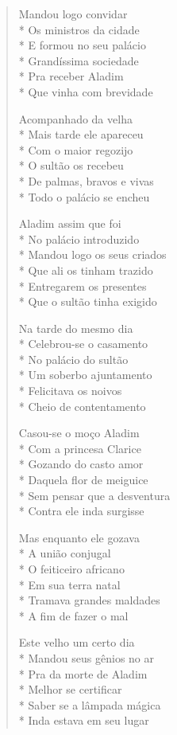 \begin{verse}
Mandou logo convidar\\*
Os ministros da cidade\\*
E formou no seu palácio\\*
Grandíssima sociedade\\*
Pra receber Aladim\\*
Que vinha com brevidade

Acompanhado da velha\\*
Mais tarde ele apareceu\\*
Com o maior regozijo\\*
O sultão os recebeu\\*
De palmas, bravos e vivas\\*
Todo o palácio se encheu

Aladim assim que foi\\*
No palácio introduzido\\*
Mandou logo os seus criados\\*
Que ali os tinham trazido\\*
Entregarem os presentes\\*
Que o sultão tinha exigido

Na tarde do mesmo dia\\*
Celebrou-se o casamento\\*
No palácio do sultão\\*
Um soberbo ajuntamento\\*
Felicitava os noivos\\*
Cheio de contentamento

Casou-se o moço Aladim\\*
Com a princesa Clarice\\*
Gozando do casto amor\\*
Daquela flor de meiguice\\*
Sem pensar que a desventura\\*
Contra ele inda surgisse

Mas enquanto ele gozava\\*
A união conjugal\\*
O feiticeiro africano\\*
Em sua terra natal\\*
Tramava grandes maldades\\*
A fim de fazer o mal

Este velho um certo dia\\*
Mandou seus gênios no ar\\*
Pra da morte de Aladim\\*
Melhor se certificar\\*
Saber se a lâmpada mágica\\*
Inda estava em seu lugar


\end{verse}
